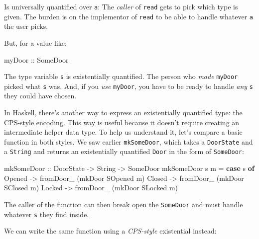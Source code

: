 \documentclass[]{article}
\newenvironment{Shaded}{}{}
\newcommand{\DataTypeTok}[1]{\textcolor[rgb]{0.56,0.13,0.00}{#1}}
\newcommand{\FunctionTok}[1]{\textcolor[rgb]{0.02,0.16,0.49}{#1}}
\newcommand{\KeywordTok}[1]{\textcolor[rgb]{0.00,0.44,0.13}{\textbf{#1}}}
\newcommand{\NormalTok}[1]{#1}
\newcommand{\OtherTok}[1]{\textcolor[rgb]{0.00,0.44,0.13}{#1}}
\begin{document}
Is universally quantified over \texttt{a}: The \emph{caller} of \texttt{read}
gets to pick which type is given. The burden is on the implementor of
\texttt{read} to be able to handle whatever \texttt{a} the user picks.

But, for a value like:

\begin{Shaded}
\begin{Highlighting}[]
\OtherTok{myDoor ::} \DataTypeTok{SomeDoor}
\end{Highlighting}
\end{Shaded}

The type variable \texttt{s} is existentially quantified. The person who
\emph{made} \texttt{myDoor} picked what \texttt{s} was. And, if you \emph{use}
\texttt{myDoor}, you have to be ready to handle \emph{any} \texttt{s} they could
have chosen.

In Haskell, there's another way to express an existentially quantified type: the
CPS-style encoding. This way is useful because it doesn't require creating an
intermediate helper data type. To help us understand it, let's compare a basic
function in both styles. We saw earlier \texttt{mkSomeDoor}, which takes a
\texttt{DoorState} and a \texttt{String} and returns an existentially quantified
\texttt{Door} in the form of \texttt{SomeDoor}:

\begin{Shaded}
\begin{Highlighting}[]
\NormalTok{mkSomeDoor}
\OtherTok{    ::} \DataTypeTok{DoorState}
    \OtherTok{->} \DataTypeTok{String}
    \OtherTok{->} \DataTypeTok{SomeDoor}
\NormalTok{mkSomeDoor s m }\FunctionTok{=} \KeywordTok{case}\NormalTok{ s }\KeywordTok{of}
    \DataTypeTok{Opened} \OtherTok{->}\NormalTok{ fromDoor_ (mkDoor }\DataTypeTok{SOpened}\NormalTok{ m)}
    \DataTypeTok{Closed} \OtherTok{->}\NormalTok{ fromDoor_ (mkDoor }\DataTypeTok{SClosed}\NormalTok{ m)}
    \DataTypeTok{Locked} \OtherTok{->}\NormalTok{ fromDoor_ (mkDoor }\DataTypeTok{SLocked}\NormalTok{ m)}
\end{Highlighting}
\end{Shaded}

The caller of the function can then break open the \texttt{SomeDoor} and must
handle whatever \texttt{s} they find inside.

We can write the same function using a \emph{CPS-style} existential instead:
\end{document}
